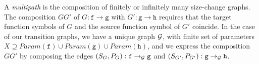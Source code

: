 A {\em multipath} \cite[Def. 2.3]{Lee3} is the composition of finitely or infinitely many size-change graphs. 
The composition $GG'$ of $G:\texttt{f} \to \texttt{g}$ with $G':\texttt{g} \to \texttt{h}$
requires that the target function symbols of $G$ and the source function symbol of $G'$ coincide. 
In the case of our transition graphs, we have a unique graph $\mathcal{G}$, with finite set of parameters $X \supseteq
 \textit{Param}(\texttt{f}) \cup \textit{Param}(\texttt{g}) \cup \textit{Param}(\texttt{h})$,
and we express the composition $GG'$ by composing 
the edges $(S_G,P_G) : \texttt{f} \to_{\mathcal{G}} \texttt{g}$ and  
$(S_{G'},P_{G'}) : \texttt{g} \to_{\mathcal{G}} \texttt{h}$. 






